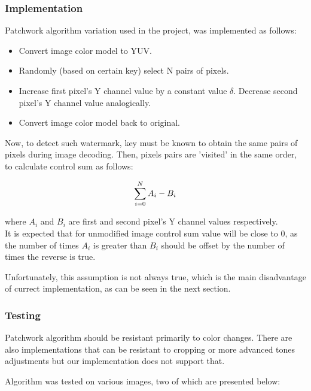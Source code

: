 \documentclass[a4paper, 12pt]{article}
\begin{document}
	\subsubsection{Implementation}
	
	Patchwork algorithm variation used in the project, was implemented as follows:
	
	\begin{itemize}
	 \item Convert image color model to YUV.
	 \item Randomly (based on certain key) select N pairs of pixels.
	 \item Increase first pixel's Y channel value by a constant value $\delta$. Decrease second pixel's Y channel value analogically.
	 \item Convert image color model back to original.
	\end{itemize}
	
	Now, to detect such watermark, key must be known to obtain the same pairs of pixels during image decoding. Then, pixels pairs are 'visited' in the same order, to calculate control sum as follows:
	
	\begin{equation}
	 \sum_{i=0}^{N} A_i - B_i \\
	\end{equation}

    where $A_i$ and $B_i$ are first and second pixel's Y channel values respectively. \\
    
    It is expected that for unmodified image control sum value will be close to 0, as the number of times $A_i$ is greater than $B_i$ should be offset by the number of times the reverse is true.
    
    Unfortunately, this assumption is not always true, which is the main disadvantage of currect implementation, as can be seen in the next section.
	
	\subsubsection{Testing}

    Patchwork algorithm should be resistant primarily to color changes. There are also implementations that can be resistant to cropping or more advanced tones adjustments but our implementation does not support that.
    
    Algorithm was tested on various images, two of which are presented below:
    
\end{document}
